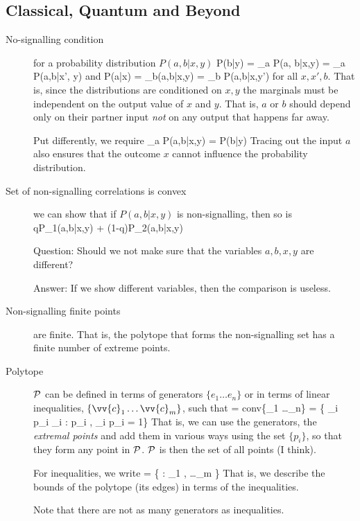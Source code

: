\subsection{Classical, Quantum and Beyond}
\begin{description}
\item[No-signalling condition] for a probability distribution $P(a, b|x,y)$
\beq
P(b|y) = \sum_a P(a, b|x,y) = \sum_a P(a,b|x', y)
\eeq
and
\beq
P(a|x) = \sum_b(a,b|x,y) = \sum_b P(a,b|x,y')
\eeq
for all $x,x',b$. That is, since the distributions are conditioned on $x,y$ the marginals must be independent on the output value of $x$ and $y$. That is, $a$ or $b$ should depend only on their partner input \emph{not} on any output that happens far away. 

Put differently, we require
\beq
\sum_a P(a,b|x,y) = P(b|y)
\eeq
Tracing out the input $a$ also ensures that the outcome $x$ cannot influence the probability distribution. 


\item[Set of non-signalling correlations is convex] we can show that if $P(a,b|x,y)$ is non-signalling, then so is 
\beq
qP_1(a,b|x,y) + (1-q)P_2(a,b|x,y)
\eeq

Question: Should we not make sure that the variables $a,b,x,y$ are different? 

Answer: If we show different variables, then the comparison is useless. 

\item[Non-signalling finite points] are finite. That is, the polytope that forms the non-signalling set has a finite number of extreme points. 

\item[Polytope] $\cal{P}$ can be defined in terms of generators $\{e_1\ldots e_n\}$ or in terms of linear inequalities, $\{ \vv{c}_1 \ldots \vv{c}_m\}$, such that 
\beq
{} = \mbox{conv}\{_1 \ldots {}_n\} = \left\{ \sum_i p_i _i : p_i , \sum_i p_i = 1\right\}
\eeq
That is, we can use the generators, the \emph{extremal points} and add them in various ways using the set $\{p_i\}$, so that they form any point in $\cal{P}$. $\cal{P}$ is then the set of all points (I think). 

For inequalities, we write
\beq
{} = \{  : _1 \cdot {}  , \ldots {}_m \cdot {}  \}
\eeq
That is, we describe the bounds of the polytope (its edges) in terms of the inequalities. 

Note that there are not as many generators as inequalities. 


\end{description}
